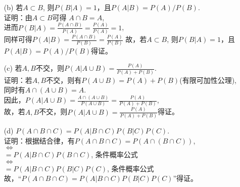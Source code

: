 \documentclass [12pt]{article}
\begin{document}
\begin{CJK*}{GBK}{kai}
\begin{enumerate}
  \item[(b)]  若$A \subset B$, 则$P(B|A)=1$，且$P(A|B)=P(A)/P(B)$.\\
  证明：由$A \subset B$可得 $A \cap B = A$, \\
  进而$P(B|A)=\frac{P(A \cap B)}{P(A)}=\frac{P(A)}{P(A)}=1$,\\
  同样可得$P(A|B)=\frac{P(A \cap B)}{P(B)}=\frac{P(A)}{P(B)}$
  故，若$A \subset B$, 则$P(B|A)=1$，且$P(A|B)=P(A)/P(B)$得证。
  
  \item[(c)]  若$A, B$不交，则$P(A|A\cup B)=\frac{P(A)}{P(A)+P(B)}$.\\
  证明：若$A, B$不交，则有$P(A \cup B)=P(A)+P(B)$(有限可加性公理),\\
  同时有$A \cap (A \cup B) = A$.\\
  因此，$P(A|A\cup B)=\frac{A \cap (A\cup B)}{P(A\cup B)}=\frac{P(A)}{P(A)+P(B)}$,\\
  故，若$A, B$不交，则$P(A|A\cup B)=\frac{P(A)}{P(A)+P(B)}$得证。
  
  \item[(d)]  $P(A \cap B \cap C)=P(A|B \cap C)P(B|C)P(C)$.\\
  证明：根据结合律，有$P(A \cap B \cap C)=P(A \cap (B \cap C))$,\\
  $\Leftrightarrow$\\
$=P(A| B \cap C)P(B \cap C)$, 条件概率公式\\
  $\Leftrightarrow$\\
  $=P(A| B \cap C)P(B|C)P(C)$, 条件概率公式\\
  故，“$P(A \cap B \cap C)=P(A|B \cap C)P(B|C)P(C)$”得证。
 \end{enumerate}  


\end{CJK*}
\end{document}
